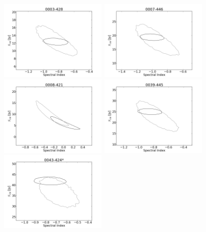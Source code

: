 \documentclass[preprint]{aastex}
\begin{document}
\begin{figure}[htbp]
\begin{center}
\includegraphics[width=2in]{plots/0003-428_SI_MCMC.png} %
\includegraphics[width=2in]{plots/0007-446_SI_MCMC.png} %
\includegraphics[width=2in]{plots/0008-421_SI_MCMC.png} %
\includegraphics[width=2in]{plots/0039-445_SI_MCMC.png} %
\includegraphics[width=2in]{plots/0043-424_SI_MCMC.png} %

\end{center}
\end{figure}
\end{document}
